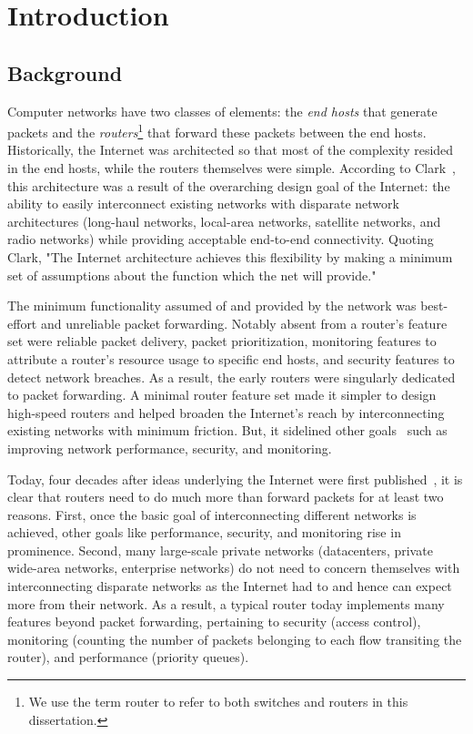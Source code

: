 \chapter{Introduction}
\label{chap:intro}

\section{Background}

Computer networks have two classes of elements: the \textit{end hosts} that
generate packets and the \textit{routers}\footnote{We use the term router to
refer to both switches and routers in this dissertation.} that forward these
packets between the end hosts. Historically, the Internet was architected so
that most of the complexity resided in the end hosts, while the routers
themselves were simple. According to Clark~\cite{design_philosophy}, this
architecture was a result of the overarching design goal of the Internet: the
ability to easily interconnect existing networks with disparate network
architectures (\eg long-haul networks, local-area networks, satellite networks,
and radio networks) while providing acceptable end-to-end connectivity. Quoting
Clark, "The Internet architecture achieves this flexibility by making a minimum
set of assumptions about the function which the net will provide."

The minimum functionality assumed of and provided by the network was
best-effort and unreliable packet forwarding. Notably absent from a router's
feature set were reliable packet delivery, packet prioritization, monitoring
features to attribute a router's resource usage to specific end hosts, and
security features to detect network breaches. As a result, the early routers
were singularly dedicated to packet forwarding. A minimal router feature set
made it simpler to design high-speed routers and helped broaden the Internet's
reach by interconnecting existing networks with minimum friction. But, it
sidelined other goals~\cite{design_philosophy} such as improving network
performance, security, and monitoring.
 
Today, four decades after ideas underlying the Internet were first
published~\cite{cerf74}, it is clear that routers need to do much more than
forward packets for at least two reasons. First, once the basic goal of
interconnecting different networks is achieved, other goals like performance,
security, and monitoring rise in prominence.  Second, many large-scale private
networks (\eg datacenters, private wide-area networks, enterprise networks) do
not need to concern themselves with interconnecting disparate networks as the
Internet had to and hence can expect more from their network. As a result, a
typical router today implements many features beyond packet forwarding,
pertaining to security (\eg access control), monitoring (\eg counting the
number of packets belonging to each flow transiting the router), and
performance (\eg priority queues).

